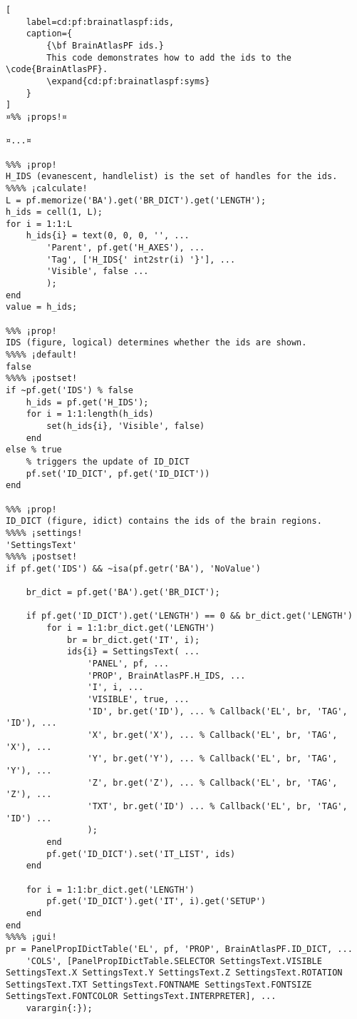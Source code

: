 \documentclass{tufte-handout}
\begin{document}
\begin{lstlisting}[
	label=cd:pf:brainatlaspf:ids,
	caption={
		{\bf BrainAtlasPF ids.}
		This code demonstrates how to add the ids to the \code{BrainAtlasPF}.
		\expand{cd:pf:brainatlaspf:syms}
	}
]
¤%% ¡props!¤
 
¤...¤

%%% ¡prop!
H_IDS (evanescent, handlelist) is the set of handles for the ids.
%%%% ¡calculate!
L = pf.memorize('BA').get('BR_DICT').get('LENGTH');
h_ids = cell(1, L);
for i = 1:1:L
    h_ids{i} = text(0, 0, 0, '', ...
        'Parent', pf.get('H_AXES'), ...
        'Tag', ['H_IDS{' int2str(i) '}'], ...
        'Visible', false ...
        );
end
value = h_ids;

%%% ¡prop!
IDS (figure, logical) determines whether the ids are shown.
%%%% ¡default!
false
%%%% ¡postset!
if ~pf.get('IDS') % false
    h_ids = pf.get('H_IDS');
    for i = 1:1:length(h_ids)
        set(h_ids{i}, 'Visible', false)
    end        
else % true
    % triggers the update of ID_DICT
    pf.set('ID_DICT', pf.get('ID_DICT'))
end

%%% ¡prop!
ID_DICT (figure, idict) contains the ids of the brain regions.
%%%% ¡settings!
'SettingsText'
%%%% ¡postset!
if pf.get('IDS') && ~isa(pf.getr('BA'), 'NoValue')

    br_dict = pf.get('BA').get('BR_DICT');

    if pf.get('ID_DICT').get('LENGTH') == 0 && br_dict.get('LENGTH')
        for i = 1:1:br_dict.get('LENGTH')
            br = br_dict.get('IT', i);
            ids{i} = SettingsText( ...
                'PANEL', pf, ...
                'PROP', BrainAtlasPF.H_IDS, ...
                'I', i, ...
                'VISIBLE', true, ...
                'ID', br.get('ID'), ... % Callback('EL', br, 'TAG', 'ID'), ...
                'X', br.get('X'), ... % Callback('EL', br, 'TAG', 'X'), ...
                'Y', br.get('Y'), ... % Callback('EL', br, 'TAG', 'Y'), ...
                'Z', br.get('Z'), ... % Callback('EL', br, 'TAG', 'Z'), ...
                'TXT', br.get('ID') ... % Callback('EL', br, 'TAG', 'ID') ...
                );
        end
        pf.get('ID_DICT').set('IT_LIST', ids)
    end
    
    for i = 1:1:br_dict.get('LENGTH')
        pf.get('ID_DICT').get('IT', i).get('SETUP')
    end
end
%%%% ¡gui!
pr = PanelPropIDictTable('EL', pf, 'PROP', BrainAtlasPF.ID_DICT, ...
    'COLS', [PanelPropIDictTable.SELECTOR SettingsText.VISIBLE SettingsText.X SettingsText.Y SettingsText.Z SettingsText.ROTATION SettingsText.TXT SettingsText.FONTNAME SettingsText.FONTSIZE SettingsText.FONTCOLOR SettingsText.INTERPRETER], ...
    varargin{:});


\end{lstlisting}
\end{document}
